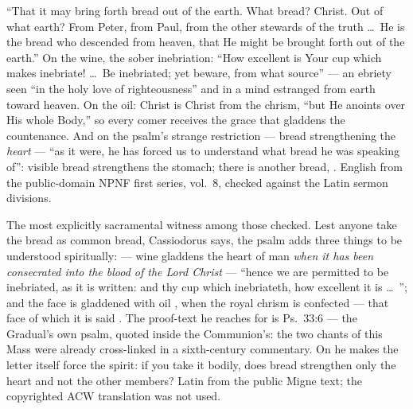 \begin{witnessnote}
``That it may bring forth bread out of the earth. What bread? Christ. Out of
what earth? From Peter, from Paul, from the other stewards of the truth
\dots\ He is the bread who descended from heaven, that He might be brought
forth out of the earth.'' On the wine, the sober inebriation: ``How
excellent is Your cup which makes inebriate! \dots\ Be inebriated; yet
beware, from what source'' --- an ebriety seen ``in the holy love of
righteousness'' and in a mind estranged from earth toward heaven. On the
oil: Christ is Christ from the chrism, ``but He anoints over His whole
Body,'' so every comer receives the grace that gladdens the countenance.
And on the psalm's strange restriction --- bread strengthening the
\textit{heart} --- ``as it were, he has forced us to understand what bread
he was speaking of'': visible bread strengthens the stomach; there is
another bread, . English from the public-domain NPNF
first series, vol.~8, checked against the Latin sermon divisions.
\end{witnessnote}

\begin{witnessnote}
The most explicitly sacramental witness among those checked. Lest anyone take
the bread as common bread, Cassiodorus says, the psalm adds three things to
be understood spiritually:  --- wine gladdens the heart of man
\textit{when it has been consecrated into the blood of the Lord Christ} ---
``hence we are permitted to be inebriated, as it is written: and thy cup
which inebriateth, how excellent it is \dots\ ''; and the face is gladdened with oil , when the royal chrism is confected --- that face of
which it is said . The proof-text he
reaches for is Ps.~33:6 --- the Gradual's own psalm, quoted inside the
Communion's: the two chants of this Mass were already cross-linked in a
sixth-century commentary. On  he makes
the letter itself force the spirit: if you take it bodily, does bread
strengthen only the heart and not the other members? Latin from the public
Migne text; the copyrighted ACW translation was not used.
\end{witnessnote}

